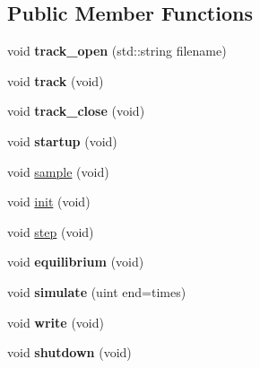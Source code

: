 \subsection*{Public Member Functions}
\begin{DoxyCompactItemize}
\item 
\hypertarget{classIOSKJ_1_1Model_a886bf4ee5289a07b220cedfd2accf801}{void {\bfseries track\-\_\-open} (std\-::string filename)}\label{classIOSKJ_1_1Model_a886bf4ee5289a07b220cedfd2accf801}

\item 
\hypertarget{classIOSKJ_1_1Model_af18a3687dd2685745174b91e0aae56ce}{void {\bfseries track} (void)}\label{classIOSKJ_1_1Model_af18a3687dd2685745174b91e0aae56ce}

\item 
\hypertarget{classIOSKJ_1_1Model_a35a3793549d5fab47834483c0c013a78}{void {\bfseries track\-\_\-close} (void)}\label{classIOSKJ_1_1Model_a35a3793549d5fab47834483c0c013a78}

\item 
\hypertarget{classIOSKJ_1_1Model_a6f42bfc7352faa7bba7e00d04fc166b0}{void {\bfseries startup} (void)}\label{classIOSKJ_1_1Model_a6f42bfc7352faa7bba7e00d04fc166b0}

\item 
void \hyperlink{classIOSKJ_1_1Model_a242ba7c47871099bf4bed482d262cede}{sample} (void)
\item 
void \hyperlink{classIOSKJ_1_1Model_af64274ff5991d11e1c232618af8de800}{init} (void)
\item 
void \hyperlink{classIOSKJ_1_1Model_af163ebda22001c7df308dc227c1687bb}{step} (void)
\item 
\hypertarget{classIOSKJ_1_1Model_a58e460b456d7affc4f6a8af785f6e82c}{void {\bfseries equilibrium} (void)}\label{classIOSKJ_1_1Model_a58e460b456d7affc4f6a8af785f6e82c}

\item 
\hypertarget{classIOSKJ_1_1Model_af17ad85c098293b9b7e13fbdb959bf02}{void {\bfseries simulate} (uint end=times)}\label{classIOSKJ_1_1Model_af17ad85c098293b9b7e13fbdb959bf02}

\item 
\hypertarget{classIOSKJ_1_1Model_abfc09c1b2d6bfe2802835cd5fd58c3b3}{void {\bfseries write} (void)}\label{classIOSKJ_1_1Model_abfc09c1b2d6bfe2802835cd5fd58c3b3}

\item 
\hypertarget{classIOSKJ_1_1Model_a343216d7c9019f15f01f205423001005}{void {\bfseries shutdown} (void)}\label{classIOSKJ_1_1Model_a343216d7c9019f15f01f205423001005}

\end{DoxyCompactItemize}
